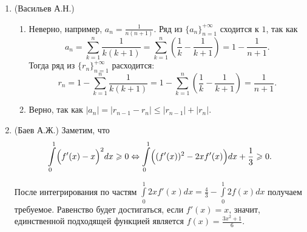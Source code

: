 \documentclass[11pt, a4paper]{article}
\begin{document}
\begin{enumerate}
\item (Васильев А.Н.) 
\begin{enumerate}
\item Неверно, например, $a_n = \frac{1}{n(n+1)}$. Ряд из $\{a_n\}_{n=1}^{+\infty}$ сходится к $1$, так как
$$a_n = \sum_{k=1}^{n} \frac{1}{k(k +1)} = \sum_{k=1}^n  \left( \frac{1}{k} - \frac{1}{k + 1} \right) = 1 - \frac{1}{n+1}.$$  Тогда ряд из $\{r_n\}_{n=1}^{+\infty}$ расходится:
$$r_n = 1 - \sum_{k=1}^{n} \frac{1}{k(k +1)} = 1 -  \sum_{k=1}^{n} \left( \frac{1}{k} - \frac{1}{k + 1} \right) = \frac{1}{n + 1}.$$
\item Верно, так как $|a_n| = |r_{n-1} - r_n| \leqslant |r_{n-1}| + |r_n|$.
\end{enumerate}

\item (Баев А.Ж.)
Заметим, что
$$
\int\limits_{0}^{1} \Bigl(f '(x) - x \Bigr)^2 dx \geqslant 0
\Leftrightarrow
\int\limits_{0}^{1} \Bigl((f '(x))^2 - 2 x f'(x) \Bigr) dx + \frac{1}{3} \geqslant 0.
$$

После интегрирования по частям $\int\limits_{0}^{1} 2 x f'(x) dx = \frac{4}{3} - \int\limits_{0}^{1} 2 f(x) dx$ получаем требуемое. Равенство будет достигаться, если $f'(x) = x$, значит, единственной подходящей функцией является $f(x) = \frac{3x^2+1}{6}$.

\end{enumerate}
\end{document}
